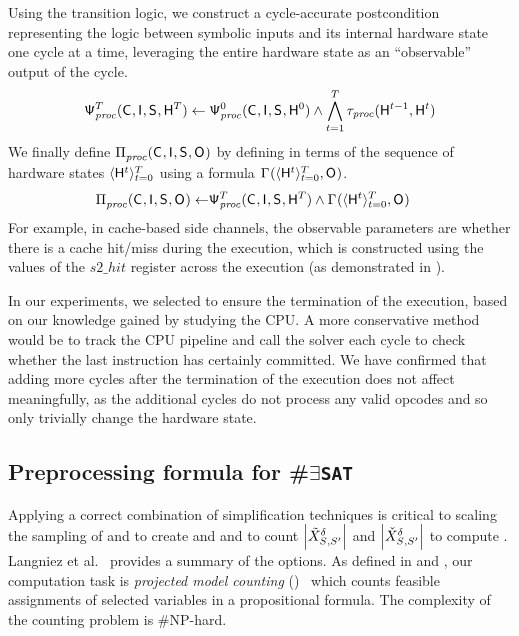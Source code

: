 Using the transition logic, we construct a cycle-accurate
postcondition \HwPostcondition{\proc}{\ncycles} representing the logic
between symbolic inputs and its internal hardware state one cycle at a
time, leveraging the entire hardware state as an ``observable'' output
of the cycle.
\[\mathsf{\Psi}_{\mathit{proc}}^{T}(\mathsf{C}_{}, \mathsf{I}_{}, \mathsf{S}_{}, \mathsf{H}_{}^{T})
    \leftarrow 
\mathsf{\Psi}_{\mathit{proc}}^{0}(\mathsf{C}_{}, \mathsf{I}_{}, \mathsf{S}_{},
\mathsf{H}_{}^{0}) \wedge
   \bigwedge_{t = 1}^{T} 
   \tau_{\mathit{proc}}(\mathsf{H}_{}^{t-1},\mathsf{H}_{}^{t})
\]
We finally define $\Pi_{\mathit{proc}}^{}(\mathsf{C}_{},
\mathsf{I}_{}, \mathsf{S}_{}, \mathsf{O}_{})$ by defining \AOOFn{} in terms of the sequence of
hardware states $\langle
\mathsf{H}_{}^{t}\rangle_{t=0}^{T}$ using a formula
$\Gamma_{}^{}(\langle
\mathsf{H}_{}^{t}\rangle_{t=0}^{T}, \mathsf{O}_{})$.
\begin{align}
\Pi_{\mathit{proc}}^{}(\mathsf{C}_{}, \mathsf{I}_{}, \mathsf{S}_{}, \mathsf{O}_{})\leftarrow
&\mathsf{\Psi}_{\mathit{proc}}^{T}(\mathsf{C}_{} ,\mathsf{I}_{},\mathsf{S}_{},\mathsf{H}_{}^{T}) \wedge
\Gamma_{}^{}(\langle\mathsf{H}_{}^{t}\rangle_{t=0}^{T}, \mathsf{O}_{})
\label{eqn:build-postcondition}
\end{align}
For example, in cache-based side channels, the observable parameters
are whether there is a cache hit/miss during the execution, which is
constructed using the values of the $s2\_hit$ register across the
execution (as demonstrated in ).

In our experiments, we selected \ncycles to ensure the termination of
the execution, based on our knowledge gained by studying the CPU.  A
more conservative method would be to track the CPU pipeline and call
the \sat solver each cycle to check whether the last instruction has
certainly committed.  We have confirmed that adding more cycles after
the termination of the execution does not affect
\postcondition{\proc}{} meaningfully, as the additional cycles do not
process any valid opcodes and so only trivially change the hardware
state.

\subsection{Preprocessing formula for \#$\exists$\texttt{SAT}}
\label{dinome:sec:impl:preprocess}
Applying a correct combination of simplification techniques is
critical to scaling the sampling of \interferenceSet and
\noninterferenceSet to create \interferenceSetSamples and
\noninterferenceSetSamples and to count
$\left|{\tilde{X}^{\delta}_{{S_{}},{S_{}'}}}\right|$
and
$\left|{\check{X}^{\delta}_{{S_{}},{S_{}'}}}\right|$
to compute \JaccardWithDeclass{\secretsSetSize}.  Langniez et
al.~\cite{lagniez2017preprocessing} provides a summary of the options.
As defined in  and
, our computation task is
\textit{projected model counting} (\sharpESAT)~\cite{projectedmodelcount} which
counts feasible assignments of selected variables in a propositional
formula. The complexity of the counting problem is \#NP-hard.

